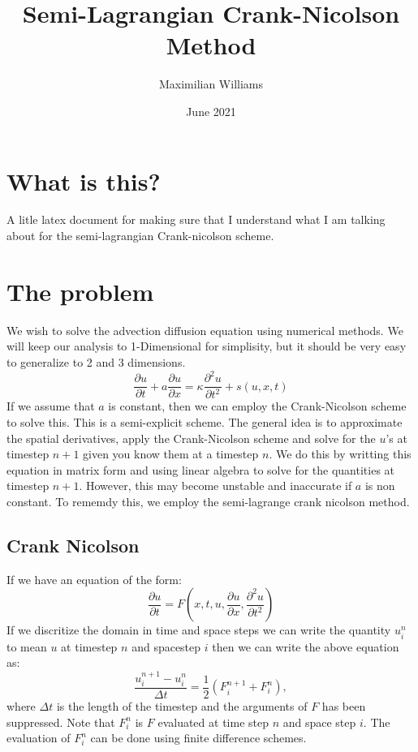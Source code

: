 \documentclass{article}
\title{Semi-Lagrangian Crank-Nicolson Method}
\author{Maximilian Williams}
\date{June 2021}
\begin{document}
\maketitle

\section*{What is this?}
A litle latex document for making sure that I understand what I am talking about for the semi-lagrangian Crank-nicolson scheme.


\section*{The problem}
We wish to solve the advection diffusion equation using numerical methods. We will keep our analysis to 1-Dimensional for simplisity, but it should be very easy to generalize to 2 and 3 dimensions.
\begin{equation}
	\frac{\partial u}{\partial t} + a \frac{\partial u}{\partial x} = \kappa \frac{\partial^2 u}{\partial t^2} + s(u,x,t)
\end{equation}
If we assume that $a$ is constant, then we can employ the Crank-Nicolson scheme to solve this. This is a semi-explicit scheme. The general idea is to approximate the spatial derivatives, apply the Crank-Nicolson scheme and solve for the $u$'s
at timestep $n+1$ given you know them at a timestep $n$. We do this by writting this equation in matrix form and using linear algebra to solve for the quantities at timestep $n+1$. However, this may become unstable and inaccurate if $a$ is non constant. To rememdy this, we employ the semi-lagrange crank nicolson method.

\subsection*{Crank Nicolson}
If we have an equation of the form:
\begin{equation}
	\frac{\partial u}{\partial t} = F(x,t,u,\frac{\partial u}{\partial x}, \frac{\partial^2 u }{\partial t^2} )
\end{equation}
If we discritize the domain in time and space steps we can write the quantity $u^{n}_i$ to mean $u$ at timestep $n$ and spacestep $i$ then we can write the above equation as:
\begin{equation}
	\frac{u^{n+1}_i - u^{n}_i}{\Delta t} = \frac{1}{2} (F^{n+1}_{i} + F^{n}_i), 
\end{equation}
where $\Delta t$ is the length of the timestep and the arguments of $F$ has been suppressed. Note that $F^{n}_i$ is $F$ evaluated at time step $n$ and space step $i$. The evaluation of $F^{n}_i$ can be done using finite difference schemes. 
\end{document}
